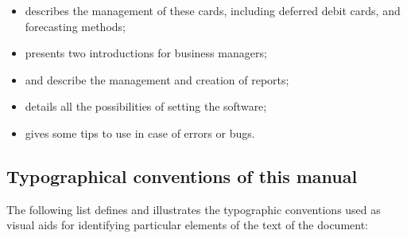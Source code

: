 \begin{itemize}
\item {} describes the management of these cards, including deferred debit cards, and forecasting methods;

\item {} presents two introductions for business managers;

\item {} and  describe the management and creation of reports;

\item {} details all the possibilities of setting the software;

\item {} gives some tips to use in case of errors or bugs.

\end{itemize}

\subsection{Typographical conventions of this manual \label{introduction-manual-conventions}}

The following list defines and illustrates the typographic conventions used as visual aids for identifying particular elements of the text of the document:


